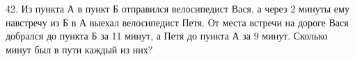 42. Из пункта А в пункт Б отправился велосипедист Вася, а через 2 минуты ему навстречу из Б в А выехал велосипедист Петя. От места встречи на дороге Вася добрался до пункта Б за 11 минут, а Петя до пункта А за 9 минут. Сколько минут был в пути каждый из них?\\
